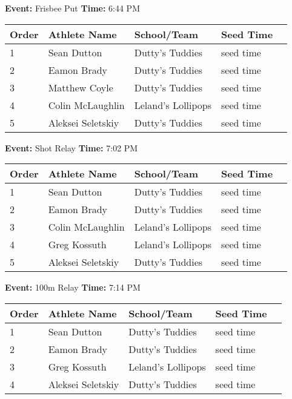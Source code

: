 \documentclass[11pt]{article}
\begin{document}
\textbf{Event:} Frisbee Put \quad \textbf{Time:} 6:44 PM 

\vspace{1em}
\begin{tabular}{@{}lllll@{}}
\toprule

\textbf{Order} & \textbf{Athlete Name} & \textbf{School/Team} & \textbf{Seed Time} \\
\midrule
1 & Sean Dutton & Dutty's Tuddies & seed time &\\
2 & Eamon Brady & Dutty's Tuddies & seed time &\\
3 & Matthew Coyle & Dutty's Tuddies & seed time &\\
4 & Colin McLaughlin & Leland's Lollipops & seed time &\\
5 & Aleksei Seletskiy & Dutty's Tuddies & seed time &\\
\bottomrule
\end{tabular}
\vspace{2.5em}


\textbf{Event:} Shot Relay \quad \textbf{Time:} 7:02 PM 

\vspace{1em}
\begin{tabular}{@{}lllll@{}}
\toprule

\textbf{Order} & \textbf{Athlete Name} & \textbf{School/Team} & \textbf{Seed Time} \\
\midrule
1 & Sean Dutton & Dutty's Tuddies & seed time &\\
2 & Eamon Brady & Dutty's Tuddies & seed time &\\
3 & Colin McLaughlin & Leland's Lollipops & seed time &\\
4 & Greg Kossuth & Leland's Lollipops & seed time &\\
5 & Aleksei Seletskiy & Dutty's Tuddies & seed time &\\
\bottomrule
\end{tabular}
\vspace{2.5em}


\textbf{Event:} 100m Relay \quad \textbf{Time:} 7:14 PM 

\vspace{1em}
\begin{tabular}{@{}lllll@{}}
\toprule

\textbf{Order} & \textbf{Athlete Name} & \textbf{School/Team} & \textbf{Seed Time} \\
\midrule
1 & Sean Dutton & Dutty's Tuddies & seed time &\\
2 & Eamon Brady & Dutty's Tuddies & seed time &\\
3 & Greg Kossuth & Leland's Lollipops & seed time &\\
4 & Aleksei Seletskiy & Dutty's Tuddies & seed time &\\
\bottomrule
\end{tabular}
\vspace{2.5em}
\end{document}
